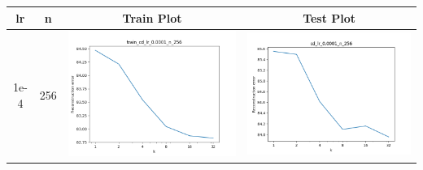 \documentclass[12pt]{report}
\begin{document}
\begin{table}[H]
  \centering
  \begin{tabular}{ | c | c | c | c |}
    \hline
    \textbf{lr} & \textbf{n} & \textbf{Train Plot} & \textbf{Test Plot} \\ \hline
    1e-4 & 256 &
    \begin{minipage}{.3\textwidth}
      \includegraphics[scale=0.25]{train_cd_lr_0_0001_n_256.png}
    \end{minipage} &
    \begin{minipage}{.3\textwidth}
      \includegraphics[scale=0.25]{cd_lr_0_0001_n_256.png}
    \end{minipage}
    \\ \hline

\end{tabular}
\end{table}
\end{document}
